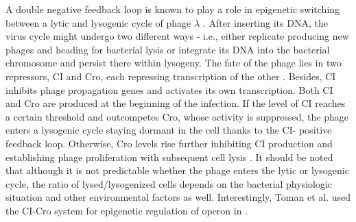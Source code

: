 A double negative feedback loop is known to play a role in epigenetic switching between a lytic and lysogenic cycle of  phage $\lambda$ \cite{smits2006phenotypic, casadesus2013programmed}.
After inserting its DNA, the virus cycle might undergo two different ways - i.e., either replicate producing new phages and heading for bacterial lysis or integrate its DNA into the bacterial chromosome and persist there within lysogeny.
The fate of the phage lies in two repressors, CI and Cro, each repressing transcription of the other \cite{eisen1970regulation, neubauer1970immunity}.
Besides, CI inhibits phage propagation genes and activates its own transcription.
Both CI and Cro are produced at the beginning of the infection.
If the level of CI reaches a certain threshold and outcompetes Cro, whose activity is suppressed, the phage enters a lysogenic cycle staying dormant in the cell thanks to the CI- positive feedback loop.
Otherwise, Cro levels rise further inhibiting CI production and establishing phage proliferation with subsequent cell lysis \cite{svenningsen2005role}.
It should be noted that although it is not predictable whether the phage enters the lytic or lysogenic cycle, the ratio of lysed/lysogenized cells depends on the bacterial physiologic situation and other environmental factors as well.
Interestingly, Toman et al. used the CI-Cro system for epigenetic regulation of  operon in  \cite{toman1985system}.



